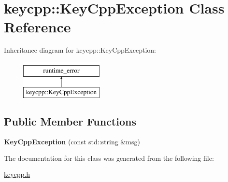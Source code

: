 \hypertarget{classkeycpp_1_1_key_cpp_exception}{\section{keycpp\-:\-:Key\-Cpp\-Exception Class Reference}
\label{classkeycpp_1_1_key_cpp_exception}
}
Inheritance diagram for keycpp\-:\-:Key\-Cpp\-Exception\-:\begin{figure}[H]
\begin{center}
\leavevmode
\includegraphics[height=2.000000cm]{classkeycpp_1_1_key_cpp_exception}
\end{center}
\end{figure}
\subsection*{Public Member Functions}
\begin{DoxyCompactItemize}
\item 
\hypertarget{classkeycpp_1_1_key_cpp_exception_af12dadc3f596f1e82cd65d55c2f64c65}{{\bfseries Key\-Cpp\-Exception} (const std\-::string \&msg)}\label{classkeycpp_1_1_key_cpp_exception_af12dadc3f596f1e82cd65d55c2f64c65}

\end{DoxyCompactItemize}


The documentation for this class was generated from the following file\-:\begin{DoxyCompactItemize}
\item 
\hyperlink{keycpp_8h}{keycpp.\-h}\end{DoxyCompactItemize}
